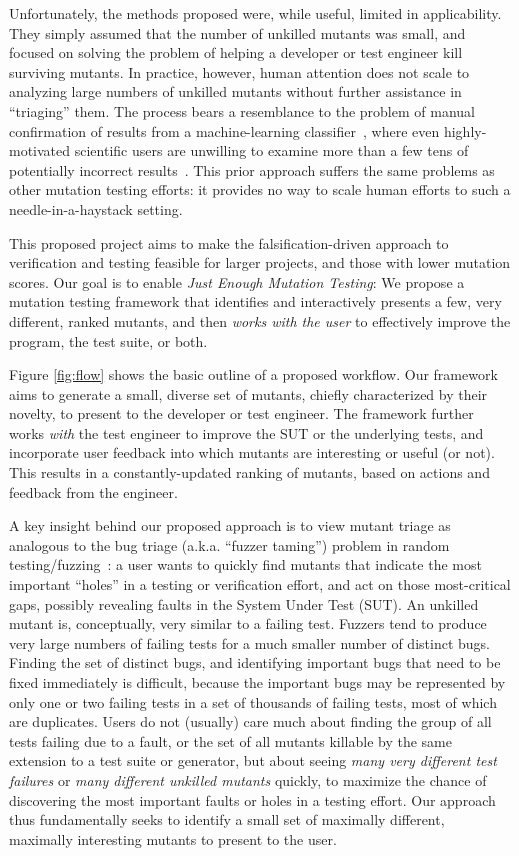 Unfortunately, the
methods proposed were, while useful, limited in applicability.  They simply assumed that the number of unkilled mutants was
small, and focused on solving the problem of helping a developer or
test engineer kill surviving mutants.
In practice, however, human
attention does not scale to analyzing large numbers of
unkilled mutants without further assistance in ``triaging'' them.  The process bears a
resemblance to the problem of manual confirmation of results from a
machine-learning classifier~\cite{OnlyOracle,EndUserMistake}, where even highly-motivated scientific
users are unwilling to examine more than a few tens of
potentially incorrect results~\cite{Segal}.
This prior approach suffers the same problems as other
mutation testing efforts: it provides no way to
scale human efforts to such a needle-in-a-haystack setting.

This proposed project aims to make the falsification-driven approach to verification and testing feasible for larger
projects, and those with lower mutation scores.
Our goal is to enable \emph{Just Enough Mutation Testing}: We propose a mutation
testing framework that identifies and interactively presents a few, very
different, ranked mutants, and then \emph{works with the user} to 
effectively improve the program, the test suite, or both.

Figure \ref{fig:flow} shows the basic outline of a proposed workflow.
%
Our framework aims to generate a small, diverse set of
mutants, chiefly characterized by their novelty, to present to the developer or
test engineer.  The framework further works
 \emph{with} the test engineer to improve the SUT or
the underlying tests, and incorporate user feedback into which mutants are
interesting or useful (or not).  This results in a constantly-updated ranking of mutants,
based on actions and feedback from the engineer.

A key insight behind our proposed approach is to view mutant triage as
analogous to the bug triage
(a.k.a.  ``fuzzer
taming'') problem in random testing/fuzzing~\cite{PLDI13,distMut,SemCrash,vantonder-ase18}:  a user wants
to quickly find mutants that indicate the most important ``holes'' in a testing
or verification effort, and act on those most-critical gaps, possibly revealing
faults in the System Under Test (SUT).
An unkilled mutant is, conceptually, very similar to a failing test.
Fuzzers tend to produce very large numbers of failing tests for a much
smaller number of distinct bugs.  Finding the set of distinct bugs,
and identifying important bugs that need to be fixed immediately is
difficult, because the important bugs may be represented by only one
or two failing tests in a set of thousands of failing tests, most of
which are duplicates.
Users do not (usually) care much
about finding the group of all tests failing due to a fault, or the
set of all mutants killable by the same extension to a test suite or
generator, but about seeing \emph{many very different test failures}
or \emph{many
  different unkilled mutants} quickly, to maximize the chance of
discovering the most important faults or holes in a testing effort.
Our approach thus fundamentally seeks to identify a small set of maximally different, maximally interesting mutants to present
to the user.

